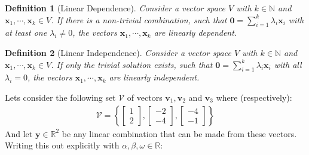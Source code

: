 \documentclass[a4paper,12pt]{book}
\newcommand{\set}[1]{\mathcal{#1}}
\newcommand{\vectr}[1]{\textbf{#1}}
\newcommand{\real}{\mathbb{R}}
\newcommand{\natral}{\mathbb{N}}
\newcommand{\italic}[1]{\textit{#1}}
\newtheorem{definition}{Definition}[section]
\begin{document}
	\begin{definition}[Linear Dependence] 
		\normalfont Consider a vector space $\italic{V}$ with $k \in \natral$ and  $\vectr{x}_1,\cdots,\vectr{x}_k \in \italic{V}$. If there is a non-trivial combination, such that $\vectr{0} = \sum_{i=1}^{k} \lambda_i\vectr{x}_i$ with at least one $\lambda_i \ne 0$, the vectors  $\vectr{x}_1,\cdots,\vectr{x}_k$ are \italic{linearly dependent}. \label{def:linear_independence}
	\end{definition} 
	\begin{definition}[Linear Independence]
		\normalfont Consider a vector space $\italic{V}$ with $k \in \natral$ and  $\vectr{x}_1,\cdots,\vectr{x}_k \in \italic{V}$. If only the trivial solution exists, such that $\vectr{0} = \sum_{i=1}^{k} \lambda_i\vectr{x}_i$ with all $\lambda_i = 0$, the vectors $\vectr{x}_1,\cdots,\vectr{x}_k $ are \italic{linearly independent}.
		\label{def:linear_independence}
	\end{definition}
	Lets consider the following set $\set{V}$ of vectors $\vectr{v}_1,\vectr{v}_2 $ and $ \vectr{v}_3$ where (respectively):
	\begin{align}
		\set{V} = \left\{\begin{bmatrix} 1 \\ 2 \end{bmatrix},\begin{bmatrix} -2 \\ -4 \end{bmatrix},\begin{bmatrix} -4 \\ -1 \end{bmatrix} \right\}
	\end{align}
	And let $\vectr{y} \in \real^2$ be any linear combination that can be made from these vectors. Writing this out explicitly with $\alpha, \beta, \omega \in \real$:
\end{document}
